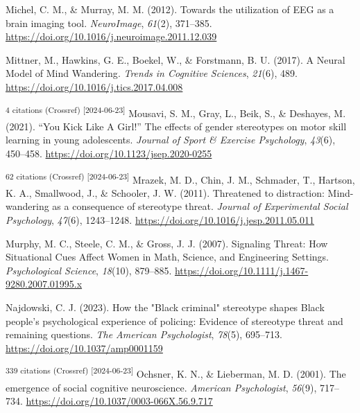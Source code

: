 \documentclass[
  stu, a4paper,floatsintext]{apa7}
\newlength{\cslhangindent}
\newenvironment{CSLReferences}[2] %
 {\begin{list}{}{%
  \setlength{\itemindent}{0pt}
  \setlength{\leftmargin}{0pt}
  \setlength{\parsep}{0pt}
  \ifodd #1
   \setlength{\leftmargin}{\cslhangindent}
   \setlength{\itemindent}{-1\cslhangindent}
  \fi
  \setlength{\itemsep}{#2\baselineskip}}}
 {\end{list}}
\begin{document}
\begin{CSLReferences}{1}{0}
Michel, C. M., \& Murray, M. M. (2012). Towards the utilization of {EEG} as a brain imaging tool. \emph{NeuroImage}, \emph{61}(2), 371--385. \url{https://doi.org/10.1016/j.neuroimage.2011.12.039}

Mittner, M., Hawkins, G. E., Boekel, W., \& Forstmann, B. U. (2017). A {Neural Model} of {Mind Wandering}. \emph{Trends in Cognitive Sciences}, \emph{21}(6), 489. \url{https://doi.org/10.1016/j.tics.2017.04.008}

\textsuperscript{4 citations (Crossref) {[}2024-06-23{]}} Mousavi, S. M., Gray, L., Beik, S., \& Deshayes, M. (2021). {``{You Kick Like A Girl}!''} The effects of gender stereotypes on motor skill learning in young adolescents. \emph{Journal of Sport \& Exercise Psychology}, \emph{43}(6), 450--458. \url{https://doi.org/10.1123/jsep.2020-0255}

\textsuperscript{62 citations (Crossref) {[}2024-06-23{]}} Mrazek, M. D., Chin, J. M., Schmader, T., Hartson, K. A., Smallwood, J., \& Schooler, J. W. (2011). Threatened to distraction: {Mind-wandering} as a consequence of stereotype threat. \emph{Journal of Experimental Social Psychology}, \emph{47}(6), 1243--1248. \url{https://doi.org/10.1016/j.jesp.2011.05.011}

Murphy, M. C., Steele, C. M., \& Gross, J. J. (2007). Signaling {Threat}: {How Situational Cues Affect Women} in {Math}, {Science}, and {Engineering Settings}. \emph{Psychological Science}, \emph{18}(10), 879--885. \url{https://doi.org/10.1111/j.1467-9280.2007.01995.x}

Najdowski, C. J. (2023). How the "{Black} criminal" stereotype shapes {Black} people's psychological experience of policing: {Evidence} of stereotype threat and remaining questions. \emph{The American Psychologist}, \emph{78}(5), 695--713. \url{https://doi.org/10.1037/amp0001159}

\textsuperscript{339 citations (Crossref) {[}2024-06-23{]}} Ochsner, K. N., \& Lieberman, M. D. (2001). The emergence of social cognitive neuroscience. \emph{American Psychologist}, \emph{56}(9), 717--734. \url{https://doi.org/10.1037/0003-066X.56.9.717}


\end{CSLReferences}
\end{document}
